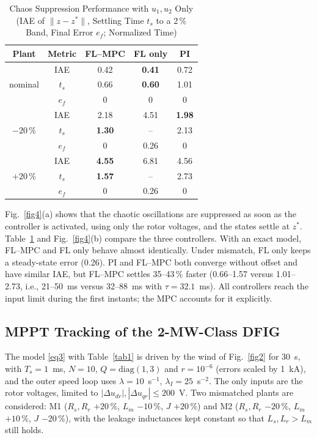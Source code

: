 \documentclass[conference]{IEEEtran}
\begin{document}
\begin{table}[htbp]
\caption{Chaos Suppression Performance with $u_1,u_2$ Only (IAE of $\|z-z^\ast\|$, Settling Time $t_s$ to a 2\,\% Band, Final Error $e_f$; Normalized Time)}
\begin{center}
\begin{tabular}{|c|c|c|c|c|}
\hline
\textbf{Plant} & \textbf{Metric} & \textbf{FL--MPC} & \textbf{FL only} & \textbf{PI} \\
\hline
 & IAE & 0.42 & \textbf{0.41} & 0.72 \\
nominal & $t_s$ & 0.66 & \textbf{0.60} & 1.01 \\
 & $e_f$ & 0 & 0 & 0 \\
\hline
 & IAE & 2.18 & 4.51 & \textbf{1.98} \\
$-20\,\%$ & $t_s$ & \textbf{1.30} & -- & 2.13 \\
 & $e_f$ & 0 & 0.26 & 0 \\
\hline
 & IAE & \textbf{4.55} & 6.81 & 4.56 \\
$+20\,\%$ & $t_s$ & \textbf{1.57} & -- & 2.73 \\
 & $e_f$ & 0 & 0.26 & 0 \\
\hline
\end{tabular}
\label{tab2}
\end{center}
\end{table}

Fig.~\ref{fig4}(a) shows that the chaotic oscillations are suppressed as soon as the controller is activated, using only the rotor voltages, and the states settle at $z^\ast$. Table~\ref{tab2} and Fig.~\ref{fig4}(b) compare the three controllers. With an exact model, FL--MPC and FL only behave almost identically. Under mismatch, FL only keeps a steady-state error (0.26). PI and FL--MPC both converge without offset and have similar IAE, but FL--MPC settles 35--43\,\% faster (0.66--1.57 versus 1.01--2.73, i.e., 21--50~ms versus 32--88~ms with $\tau=32.1$~ms). All controllers reach the input limit during the first instants; the MPC accounts for it explicitly.

\subsection{MPPT Tracking of the 2-MW-Class DFIG}

The model \eqref{eq3} with Table~\ref{tab1} is driven by the wind of Fig.~\ref{fig2} for 30~s, with $T_s=1$~ms, $N=10$, $Q=\text{diag}(1,3)$ and $r=10^{-6}$ (errors scaled by 1~kA), and the outer speed loop uses $\lambda=10$~s$^{-1}$, $\lambda_I=25$~s$^{-2}$. The only inputs are the rotor voltages, limited to $|\Delta u_{dr}|,|\Delta u_{qr}|\le200$~V. Two mismatched plants are considered: M1 ($R_s,R_r$ $+20\,\%$, $L_m$ $-10\,\%$, $J$ $+20\,\%$) and M2 ($R_s,R_r$ $-20\,\%$, $L_m$ $+10\,\%$, $J$ $-20\,\%$), with the leakage inductances kept constant so that $L_s,L_r>L_m$ still holds.
\end{document}
